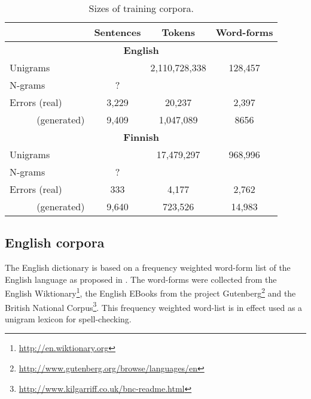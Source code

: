 \documentclass{llncs}
\begin{document}
\begin{table}
    \caption{Sizes of training corpora.
    \label{table:corpora}}
  \begin{center}
      \begin{tabular}{lccc}
        \hline
         & Sentences & Tokens & Word-forms \\
        \hline
        \multicolumn{4}{c}{\textbf{English}} \\
        \hline
        Unigrams &  & 2,110,728,338 & 128,457  \\
        N-grams & ? & & \\
        Errors (real) & 3,229 & 20,237 & 2,397 \\
        \,\,\,\,\,\,\,\,\,\,\,\,\,\,\, (generated) & 9,409 & 1,047,089 & 8656 \\
        \hline
        \multicolumn{4}{c}{\textbf{Finnish}} \\
        \hline
        Unigrams &  & 17,479,297 & 968,996 \\
        N-grams & ? & & \\
        Errors (real) & 333 & 4,177 & 2,762 \\
        \,\,\,\,\,\,\,\,\,\,\,\,\,\,\, (generated) & 9,640 & 723,526 & 14,983 \\
        \hline
      \end{tabular}
  \end{center}
\end{table}

\subsection{English corpora}

The English dictionary is based on a frequency weighted word-form list of
the English language as proposed in \cite{norvig/2010}. The word-forms were
collected from the English Wiktionary\footnote{\url{http://en.wiktionary.org}},
the English EBooks from the project
Gutenberg\footnote{\url{http://www.gutenberg.org/browse/languages/en}} and the
British National
Corpus\footnote{\url{http://www.kilgarriff.co.uk/bnc-readme.html}}. This
frequency weighted word-list is in effect used as a unigram lexicon for spell-checking.
\end{document}
